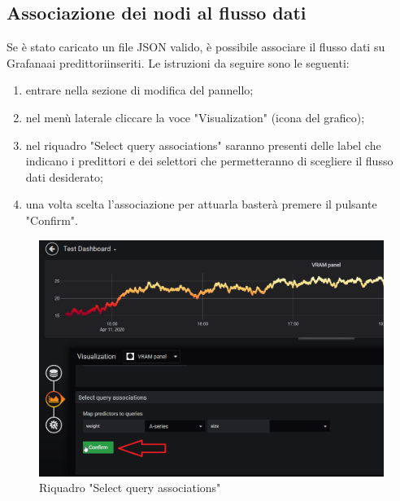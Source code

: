     \subsection{Associazione dei nodi al flusso dati}
        Se è stato caricato un file JSON valido, è possibile associare il flusso dati su Grafana\glosp ai predittori\glosp inseriti. Le istruzioni da seguire sono le seguenti:
        \begin{enumerate}
            \item entrare nella sezione di modifica del pannello;
            \item nel menù laterale cliccare la voce "Visualization" (icona del grafico);
            \item nel riquadro "Select query associations" saranno presenti delle label che indicano i predittori e dei selettori che permetteranno di scegliere il flusso dati desiderato;
            \item una volta scelta l'associazione per attuarla basterà premere il pulsante "Confirm".
        \end{enumerate}
        \begin{figure}[H]
            \includegraphics[width=\textwidth,height=\textheight,keepaspectratio]{img/associazione_nodi.png}
            \caption{Riquadro "Select query associations"}
        \end{figure}
